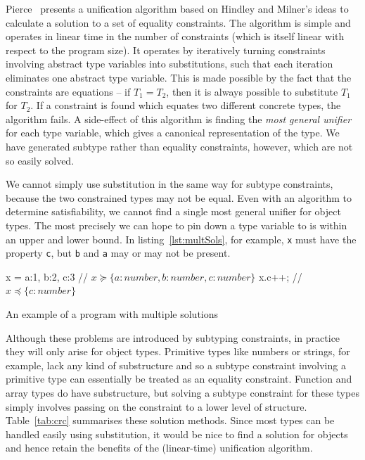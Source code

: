 \documentclass[12pt,a4paper,twoside,openright]{report}
\theoremstyle{definition}
\theoremstyle{dotless}
\newcommand*{\js}{\texttt}
\begin{document}
Pierce~\cite{pierce} presents a unification algorithm based on Hindley and
Milner's ideas to calculate a solution to a set of equality constraints. The
algorithm is simple and operates in linear time in the number of constraints
(which is itself linear with respect to the program size). It operates by
iteratively turning constraints involving abstract type variables into
substitutions, such that each iteration eliminates one abstract type variable.
This is made possible by the fact that the constraints are equations -- if
$T_1=T_2$, then it is always possible to substitute $T_1$ for $T_2$. If a
constraint is found which equates two different concrete types, the algorithm
fails. A side-effect of this algorithm is finding the \textit{most general
  unifier} for each type variable, which gives a canonical
representation of the type.  We have generated subtype rather than equality constraints, however,
which are not so easily solved.

We cannot simply use substitution in the same way for subtype constraints,
because the two constrained types may not be equal. Even with an algorithm to
determine satisfiability, we cannot find a single most general unifier for
object types.  The most precisely we can hope to pin down a type variable to is
within an upper and lower bound.  In listing~\ref{lst:multSols}, for example,
\js{x} must have the property \js{c}, but \js{b} and \js{a} may or may not be
present.  

\begin{listing}[H]
  \begin{jscript}
	x = {a:1, b:2, c:3} // $x \succeq \{a:number, b:number, c:number\}$
	x.c++;              // $x \preceq \{c:number\}$
  \end{jscript}
  \caption{An example of a program with multiple solutions}\label{lst:multSols}
\end{listing}

Although these problems are introduced by subtyping constraints, in practice
they will only arise for object types. Primitive types like numbers or strings,
for example, lack any kind of substructure and so a subtype constraint
involving a primitive type can essentially be treated as an equality
constraint. Function and array types do have substructure, but solving a
subtype constraint for these types simply involves passing on the constraint to
a lower level of structure. Table~\ref{tab:crc} summarises these solution
methods. Since most types can be handled easily using substitution, it would be
nice to find a solution for objects and hence retain the benefits of the
(linear-time) unification algorithm. 
\end{document}
